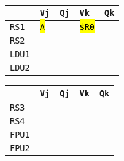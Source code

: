\begin{enumerate}
    \begin{minipage}{0.45\textwidth}
        \centering
        \begin{tabular}{@{} l | l l l l @{}}
            \toprule
                & \texttt{Vj} & \texttt{Qj} & \texttt{Vk} & \texttt{Qk} \\
            \midrule
            \texttt{RS1} & \hl{\texttt{A}} & & \hl{\texttt{\$R0}} & \\ [.3em]
            \texttt{RS2} & & & & \\
            \cmidrule{1-5}
            \texttt{LDU1} & & & & \\ [.3em]
            \texttt{LDU2} & & & & \\
            \bottomrule
        \end{tabular}
    \end{minipage}
    \hfill
    \begin{minipage}{0.45\textwidth}
        \centering
        \begin{tabular}{@{} l | l l l l @{}}
            \toprule
            & \texttt{Vj} & \texttt{Qj} & \texttt{Vk} & \texttt{Qk} \\
            \midrule
            \texttt{RS3} & & & & \\ [.3em]
            \texttt{RS4} & & & & \\
            \cmidrule{1-5}
            \texttt{FPU1} & & & & \\ [.3em]
            \texttt{FPU2} & & & & \\
            \bottomrule
        \end{tabular}
    \end{minipage}


\end{enumerate}
